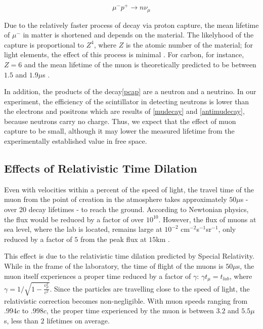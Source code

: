 \begin{equation}\mu^-p^+ \rightarrow n \nu_{\mu} \label{pcap} \end{equation}

Due to the relatively faster process of decay via proton capture, the
mean lifetime of $\mu^-$ in matter is shortened and depends on the
material. The likelyhood of the capture is proportional to $Z^4$,
where $Z$ is the atomic number of the material; for light elements,
the effect of this process is minimal \cite[p.172]{rossi}. For carbon,
for instance, $Z=6$ and the mean lifetime of the muon is theoretically
predicted to be between $1.5$ and $1.9\mu$s \cite[p.~170]{rossi}. 

In addition, the products of the decay\eqref{pcap} are a neutron and a
neutrino. In our experiment, the efficiency of the scintillator in
detecting neutrons is lower than the electrons and positrons which are
results of \eqref{mudecay} and \eqref{antimudecay}, because neutrons
carry no charge. Thus, we expect that the effect of muon capture to be
small, although it may lower the measured lifetime from the
experimentally established value in free space.

\subsection{Effects of Relativistic Time Dilation}

Even with velocities within a percent of the speed of light, the
travel time of the muon from the point of creation in the atmosphere
takes approximately $50\mu$s - over 20 decay lifetimes - to reach the
ground. According to Newtonian physics, the flux would be reduced by a
factor of over $10^{10}$. However, the flux of muons at sea level,
where the lab is located, remains large at $10^{-2}$
cm$^{-2}$s$^{-1}$sr$^{-1}$, only reduced by a factor of $5$ from the peak
flux at $15$km \cite{rossi}.

This effect is due to the relativistic time dilation predicted by
Special Relativity. While in the frame of the laboratory, the time of
flight of the muons is $50\mu$s, the muon itself experiences a proper
time reduced by a factor of $\gamma$: $ \gamma t_{\mu} = t_{lab}$,
where $\gamma = 1/\sqrt{1 - \frac{v_{\mu}^2}{c^2}}$. Since the particles are
travelling close to the speed of light, the relativistic correction
becomes non-negligible. With muon speeds ranging from $.994c$ to
$.998c$, the proper time experienced by the muon is between $3.2$ and
$5.5\mu$s, less than $2$ lifetimes on average. 

